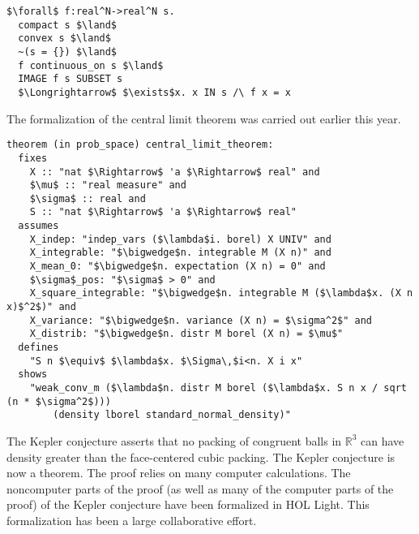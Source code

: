 \documentclass[brochure,english,12pt]{bourbaki}
\theoremstyle{plain}
\def\ring#1{{\mathbb{#1}}}
\begin{document}
\begin{lstlisting}[keepspaces=true,stringstyle=\tt,basicstyle=\small,frame=single,framesep=8pt,mathescape,morekeywords={theorem,fixes,assumes,defines,shows,Variable,Theorem,Proof,Qed},columns=flexible,caption={Brouwer fixed point formula}]
  $\forall$ f:real^N->real^N s. 
  compact s $\land$ 
  convex s $\land$
  ~(s = {}) $\land$
  f continuous_on s $\land$
  IMAGE f s SUBSET s
  $\Longrightarrow$ $\exists$x. x IN s /\ f x = x
\end{lstlisting}

The formalization of the central limit theorem was carried out earlier this year.

\begin{lstlisting}[keepspaces=true,stringstyle=\tt,basicstyle=\small,frame=single,framesep=8pt,mathescape,morekeywords={theorem,fixes,assumes,defines,shows,Variable,Theorem,Proof,Qed},columns=flexible,caption={The central limit theorem in Isabelle}]
theorem (in prob_space) central_limit_theorem:
  fixes 
    X :: "nat $\Rightarrow$ 'a $\Rightarrow$ real" and
    $\mu$ :: "real measure" and
    $\sigma$ :: real and
    S :: "nat $\Rightarrow$ 'a $\Rightarrow$ real"
  assumes
    X_indep: "indep_vars ($\lambda$i. borel) X UNIV" and
    X_integrable: "$\bigwedge$n. integrable M (X n)" and
    X_mean_0: "$\bigwedge$n. expectation (X n) = 0" and
    $\sigma$_pos: "$\sigma$ > 0" and
    X_square_integrable: "$\bigwedge$n. integrable M ($\lambda$x. (X n x)$^2$)" and
    X_variance: "$\bigwedge$n. variance (X n) = $\sigma^2$" and
    X_distrib: "$\bigwedge$n. distr M borel (X n) = $\mu$"
  defines
    "S n $\equiv$ $\lambda$x. $\Sigma\,$i<n. X i x"
  shows
    "weak_conv_m ($\lambda$n. distr M borel ($\lambda$x. S n x / sqrt (n * $\sigma^2$))) 
        (density lborel standard_normal_density)"
\end{lstlisting}



The Kepler conjecture asserts that no packing of congruent balls in $\ring{R}^3$ can have density greater than
the face-centered cubic packing.  The Kepler conjecture is now a theorem.  The proof relies on many computer
calculations.  The noncomputer parts of the proof (as well as many of the computer parts of the proof) of the Kepler conjecture 
have been formalized in HOL Light.  This formalization has been a large collaborative effort.
\end{document}
